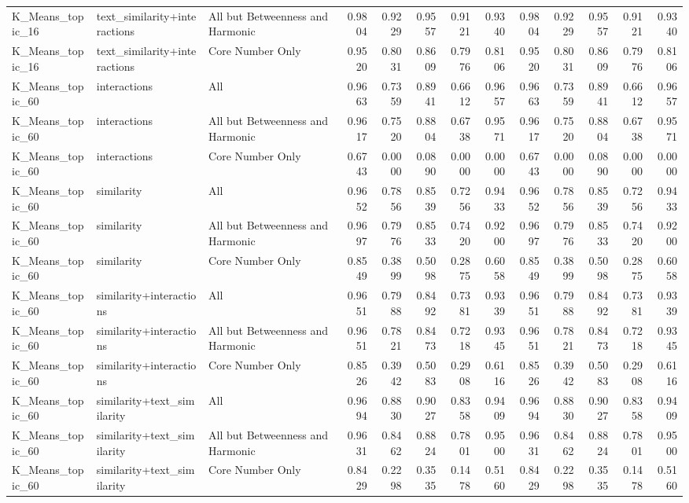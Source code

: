 \begin{tabular}{lllrrrrrrrrrr}
K_Means_topic_16 & text_similarity+interactions & All but Betweenness and Harmonic & 0.9804 & 0.9229 & 0.9557 & 0.9121 & 0.9340 & 0.9804 & 0.9229 & 0.9557 & 0.9121 & 0.9340 \\
K_Means_topic_16 & text_similarity+interactions & Core Number Only & 0.9520 & 0.8031 & 0.8609 & 0.7976 & 0.8106 & 0.9520 & 0.8031 & 0.8609 & 0.7976 & 0.8106 \\
K_Means_topic_60 & interactions & All & 0.9663 & 0.7359 & 0.8941 & 0.6612 & 0.9657 & 0.9663 & 0.7359 & 0.8941 & 0.6612 & 0.9657 \\
K_Means_topic_60 & interactions & All but Betweenness and Harmonic & 0.9617 & 0.7520 & 0.8804 & 0.6738 & 0.9571 & 0.9617 & 0.7520 & 0.8804 & 0.6738 & 0.9571 \\
K_Means_topic_60 & interactions & Core Number Only & 0.6743 & 0.0000 & 0.0890 & 0.0000 & 0.0000 & 0.6743 & 0.0000 & 0.0890 & 0.0000 & 0.0000 \\
K_Means_topic_60 & similarity & All & 0.9652 & 0.7856 & 0.8539 & 0.7256 & 0.9433 & 0.9652 & 0.7856 & 0.8539 & 0.7256 & 0.9433 \\
K_Means_topic_60 & similarity & All but Betweenness and Harmonic & 0.9697 & 0.7976 & 0.8533 & 0.7420 & 0.9200 & 0.9697 & 0.7976 & 0.8533 & 0.7420 & 0.9200 \\
K_Means_topic_60 & similarity & Core Number Only & 0.8549 & 0.3899 & 0.5098 & 0.2875 & 0.6058 & 0.8549 & 0.3899 & 0.5098 & 0.2875 & 0.6058 \\
K_Means_topic_60 & similarity+interactions & All & 0.9651 & 0.7988 & 0.8492 & 0.7381 & 0.9339 & 0.9651 & 0.7988 & 0.8492 & 0.7381 & 0.9339 \\
K_Means_topic_60 & similarity+interactions & All but Betweenness and Harmonic & 0.9651 & 0.7821 & 0.8473 & 0.7218 & 0.9345 & 0.9651 & 0.7821 & 0.8473 & 0.7218 & 0.9345 \\
K_Means_topic_60 & similarity+interactions & Core Number Only & 0.8526 & 0.3942 & 0.5083 & 0.2908 & 0.6116 & 0.8526 & 0.3942 & 0.5083 & 0.2908 & 0.6116 \\
K_Means_topic_60 & similarity+text_similarity & All & 0.9694 & 0.8830 & 0.9027 & 0.8358 & 0.9409 & 0.9694 & 0.8830 & 0.9027 & 0.8358 & 0.9409 \\
K_Means_topic_60 & similarity+text_similarity & All but Betweenness and Harmonic & 0.9631 & 0.8462 & 0.8824 & 0.7801 & 0.9500 & 0.9631 & 0.8462 & 0.8824 & 0.7801 & 0.9500 \\
K_Means_topic_60 & similarity+text_similarity & Core Number Only & 0.8429 & 0.2298 & 0.3535 & 0.1478 & 0.5160 & 0.8429 & 0.2298 & 0.3535 & 0.1478 & 0.5160 \\

\end{tabular}
